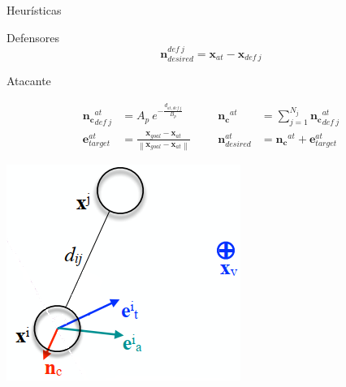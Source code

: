 \begin{frame}{Heurísticas}
    \begin{block}{Defensores}
        \footnotesize{}
        \begin{equation*}
            \mathbf{n}_{desired}^{def\ j} = \mathbf{x}_{at} - \mathbf{x}_{def\ j}
        \end{equation*}
    \end{block}
    \begin{block}{Atacante}
        \footnotesize{
        }
        \begin{minipage}{0.75\linewidth}
            \begin{equation*}
                \begin{aligned}
                    \mathbf{n_c}_{def\ j}^{at} &= A_p\ e^{-\frac{d_{at,def\ j}}{B_p}} &&& \mathbf{n_c}^{at} &= \sum_{j=1}^{N_j} \mathbf{n_c}_{def\ j}^{at} \\
                    \mathbf{e}_{target}^{at} &= \frac{\mathbf{x}_{goal} - \mathbf{x}_{at}}{\left\| \mathbf{x}_{goal} - \mathbf{x}_{at} \right\|} &&& \mathbf{n}_{desired}^{at} &= \mathbf{n_c}^{at} + \mathbf{e}_{target}^{at}
                \end{aligned}
            \end{equation*}
        \end{minipage}
        \begin{minipage}{0.2\linewidth}
            \includegraphics[width=\textwidth]{pic/01-introduccion/cpm-modified}
        \end{minipage}
    \end{block}
\end{frame}

